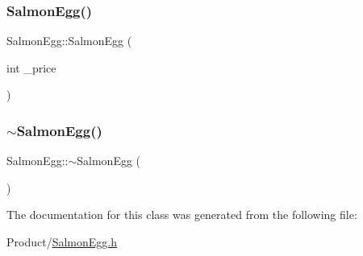 \mbox{\label{classSalmonEgg_ab6a98f7fe773dde7c3c3425316ece63f}} 
\subsubsection{\texorpdfstring{SalmonEgg()}{SalmonEgg()}\hspace{0.1cm}{\footnotesize\ttfamily [2/2]}}
{\footnotesize\ttfamily Salmon\+Egg\+::\+Salmon\+Egg (\begin{DoxyParamCaption}\item[{int}]{\+\_\+price }\end{DoxyParamCaption})}

\mbox{\label{classSalmonEgg_aac22a45e0439de30e247f6780b0e6f3e}} 
\subsubsection{\texorpdfstring{$\sim$SalmonEgg()}{~SalmonEgg()}}
{\footnotesize\ttfamily Salmon\+Egg\+::$\sim$\+Salmon\+Egg (\begin{DoxyParamCaption}{ }\end{DoxyParamCaption})}



The documentation for this class was generated from the following file\+:\begin{DoxyCompactItemize}
\item 
Product/\mbox{\hyperlink{SalmonEgg_8h}{Salmon\+Egg.\+h}}\end{DoxyCompactItemize}
